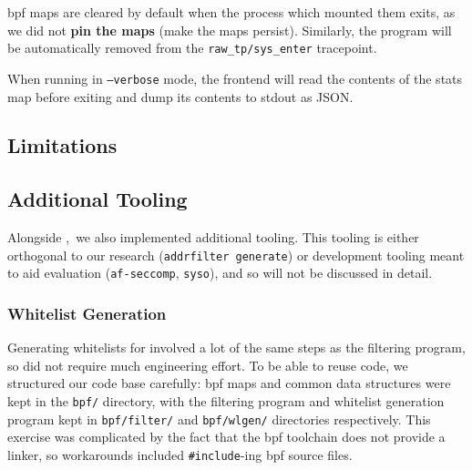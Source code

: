 \ac{bpf} maps are cleared by default when the process which mounted them exits,
as we did not \textbf{pin the maps} (make the maps persist). Similarly, the \af
program will be automatically removed from the \texttt{raw\_tp/sys\_enter}
tracepoint.

When running in \texttt{--verbose} mode, the frontend will read the contents of
the stats map before exiting and dump its contents to \ac{stdout} as JSON.

\subsection{Limitations}


\subsection{Additional Tooling}

Alongside \afss,~we also implemented additional tooling. This tooling is either
orthogonal to our research (\texttt{addrfilter generate}) or development tooling
meant to aid evaluation (\texttt{af-seccomp}, \texttt{syso}), and so will not be
discussed in detail. 

\subsubsection{Whitelist Generation}\label{subsubsec:impl-whitelist-gen}

Generating whitelists for \af involved a lot of the same steps as the filtering
program, so did not require much engineering effort. To be able to reuse code,
we structured our code base carefully: \ac{bpf} maps and common data structures
were kept in the \texttt{bpf/} directory, with the filtering program and
whitelist generation program kept in \texttt{bpf/filter/} and
\texttt{bpf/wlgen/} directories respectively. This exercise was complicated by
the fact that the \ac{bpf} toolchain does not provide a linker, so workarounds
included \texttt{\#include}-ing \ac{bpf} source files.

